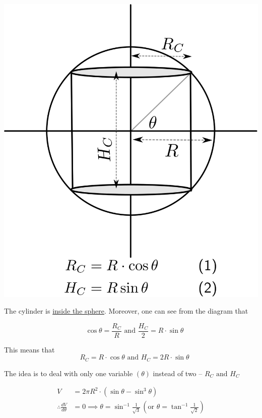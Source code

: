 \documentclass[14pt,fleqn]{extarticle}
\begin{document}
\begin{center}
\includegraphics[scale=0.5]{wrong.svg}
\begin{center}

\newcard

The cylinder is \underline{inside the sphere}. Moreover, one can see from the diagram that 

\[ \quad \cos\theta = \frac{R_C}{R} \text{ and } \frac{H_C}{2} = R\cdot \sin\theta \]

This means that 
\[ \quad R_C = R\cdot\cos\theta \text{ and } H_C = 2R\cdot\sin\theta \]

The idea is to deal with only one variable $(\theta)$ instead of two -- $R_C\text{ and } H_C$ 

\newcard 

\begin{align}
	V &= 2\pi R^2\cdot \left(\sin\theta - \sin^3\theta \right) \\
	\therefore \frac{dV}{d\theta} &= 0\implies\theta = \sin^{-1}\frac{1}{\sqrt{3}} \,\left(\text{or }\theta = \tan^{-1}\frac{1}{\sqrt{2}} \right)
\end{align}

\newcard 


\end{center}
\end{center}
\end{document}
